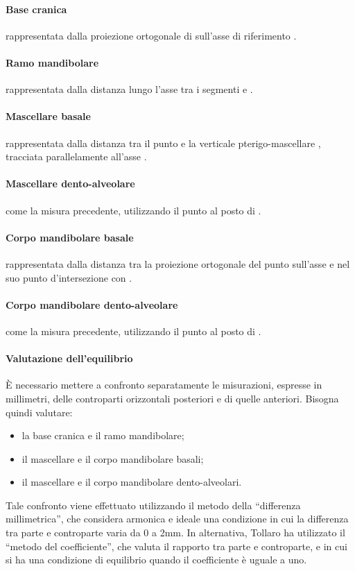 \paragraph{Base cranica} rappresentata dalla proiezione ortogonale di  sull'asse di riferimento .
\paragraph{Ramo mandibolare} rappresentata dalla distanza lungo l'asse  tra i segmenti  e .
\paragraph{Mascellare basale} rappresentata dalla distanza tra il punto  e la verticale pterigo-mascellare , tracciata parallelamente all'asse .
\paragraph{Mascellare dento-alveolare} come la misura precedente, utilizzando il punto  al posto di .
\paragraph{Corpo mandibolare basale} rappresentata dalla distanza tra la proiezione ortogonale del punto  sull'asse  e  nel suo punto d'intersezione con .
\paragraph{Corpo mandibolare dento-alveolare} come la misura precedente, utilizzando il punto  al posto di .

\paragraph{Valutazione dell'equilibrio}
È necessario mettere a confronto separatamente le misurazioni, espresse in millimetri, delle controparti orizzontali posteriori e di quelle anteriori. Bisogna quindi valutare:
\begin{itemize}
\item la base cranica e il ramo mandibolare;
\item il mascellare e il corpo mandibolare basali;
\item il mascellare e il corpo mandibolare dento-alveolari.
\end{itemize}
Tale confronto viene effettuato utilizzando il metodo della ``differenza millimetrica'', che considera armonica e ideale una condizione in cui la differenza tra parte e controparte varia da 0 a 2mm. In alternativa, Tollaro\nocite{Tollaro1981} ha utilizzato il ``metodo del coefficiente'', che valuta il rapporto tra parte e controparte, e in cui si ha una condizione di equilibrio quando il coefficiente è uguale a uno.


